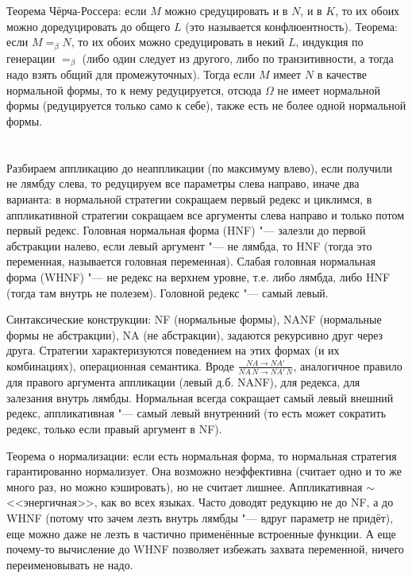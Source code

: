 \section{} %
Теорема Чёрча-Россера: если $M$ можно средуцировать и в $N$, и в $K$, то их обоих можно доредуцировать
до общего $L$ (это называется конфлюентность).
Теорема: если $M=_\beta N$, то их обоих можно средуцировать в некий $L$,
индукция по генерации $=_\beta$ (либо один следует из другого, либо по транзитивности,
а тогда надо взять общий для промежуточных).
Тогда если $M$ имеет $N$ в качестве нормальной формы, то к нему редуцируется, отсюда
$\Omega$ не имеет нормальной формы (редуцируется только само к себе),
также есть не более одной нормальной формы.

\section{} %
Разбираем аппликацию до неаппликации (по максимуму влево), если получили
не лямбду слева, то редуцируем все параметры слева направо,
иначе два варианта: в нормальной стратегии сокращаем первый редекс и циклимся,
в аппликативной стратегии сокращаем все аргументы слева направо и только потом первый редекс.
Головная нормальная форма (HNF) "--- залезли до первой абстракции налево, если левый аргумент "--- не лямбда, то HNF (тогда
это переменная, называется головная переменная).
Слабая головная нормальная форма (WHNF) "--- не редекс на верхнем уровне, т.е. либо лямбда, либо HNF (тогда там внутрь не полезем).
Головной редекс "--- самый левый.

Синтаксические конструкции: NF (нормальные формы), NANF (нормальные формы не абстракции), NA (не абстракции),
задаются рекурсивно друг через друга.
Стратегии характеризуются поведением на этих формах (и их комбинациях), операционная семантика.
Вроде $\frac{NA \to NA'}{NA\, N \to NA'\, N}$, аналогичное правило для правого аргумента аппликации (левый д.б. NANF),
для редекса, для залезания внутрь лямбды.
Нормальная всегда сокращает самый левый внешний редекс,
аппликативная "--- самый левый внутренний (то есть может сократить редекс, только если правый аргумент в NF).

Теорема о нормализации: если есть нормальная форма, то нормальная стратегия гарантированно нормализует.
Она возможно неэффективна (считает одно и то же много раз, но можно кэшировать), но не считает лишнее.
Аппликативная $\sim$ <<энергичная>>, как во всех языках.
Часто доводят редукцию не до NF, а до WHNF (потому что зачем лезть внутрь лямбды "--- вдруг параметр не придёт),
еще можно даже не лезть в частично применённые встроенные функции.
А еще почему-то вычисление до WHNF позволяет избежать захвата переменной, ничего переименовывать не надо.

